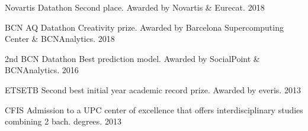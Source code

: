 
\begin{cvhonors}

  \cvhonor
    {Novartis Datathon}
    {Second place. Awarded by Novartis \& Eurecat.}
    {}
    {2018}

  \cvhonor
    {BCN AQ Datathon}
    {Creativity prize. Awarded by Barcelona Supercomputing Center \& BCNAnalytics.}
    {}
    {2018}

  \cvhonor
    {2nd BCN Datathon}
    {Best prediction model. Awarded by SocialPoint \& BCNAnalytics.}
    {}
    {2016}

  \cvhonor
    {ETSETB}
    {Second best initial year academic record prize. Awarded by everis.}
    {}
    {2013}

  \cvhonor
    {CFIS}
    {Admission to a UPC center of excellence that offers interdisciplinary studies combining 2 bach. degrees.}
    {}
    {2013}

\end{cvhonors}
